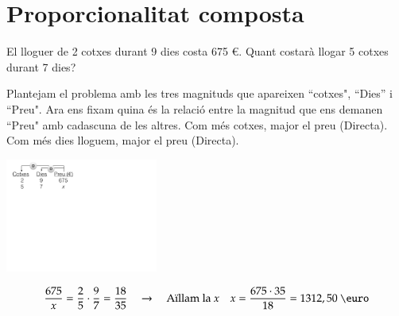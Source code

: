\section{Proporcionalitat composta}


\begin{mylist}
	\exer El lloguer de 2 cotxes durant 9
dies costa 675 \euro{}. Quant costarà llogar 5 cotxes durant 7 dies?
\end{mylist}
	\vspace{-0.25cm}
	
\begin{example}
	\begin{minipage}{0.6\textwidth}
		Plantejam el problema amb les tres magnituds que apareixen ``cotxes", ``Dies'' i ``Preu". 
		Ara ens fixam quina és la relació entre la magnitud que ens demanen ``Preu" amb cadascuna de les altres.
		Com més cotxes, major el preu (Directa). Com més dies lloguem, major el preu (Directa).
		
	\end{minipage}
	\begin{minipage}{0.4\textwidth}
		\centering
		\includegraphics[width=5cm]{img-07/proporcionalitat}
	\end{minipage}
	
	\[ \frac{675}{x} = \frac{2}{5} \cdot \frac{9}{7} = \frac{18}{35} \quad \rightarrow \quad \text{Aïllam la }x \quad x=\frac{675\cdot 35}{18}= 1312,50 \text{ \euro}  \]
\end{example}
 
